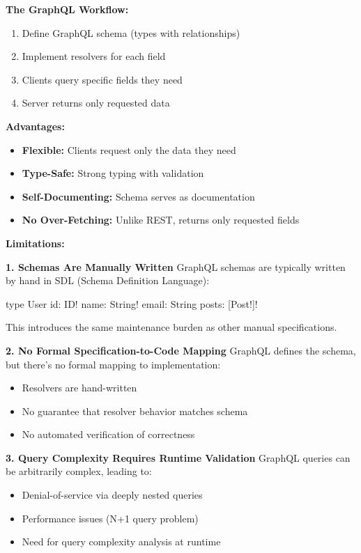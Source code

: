 \textbf{The GraphQL Workflow:}
\begin{enumerate}
    \item Define GraphQL schema (types with relationships)
    \item Implement resolvers for each field
    \item Clients query specific fields they need
    \item Server returns only requested data
\end{enumerate}

\textbf{Advantages:}
\begin{itemize}
    \item \textbf{Flexible:} Clients request only the data they need
    \item \textbf{Type-Safe:} Strong typing with validation
    \item \textbf{Self-Documenting:} Schema serves as documentation
    \item \textbf{No Over-Fetching:} Unlike REST, returns only requested fields
\end{itemize}

\textbf{Limitations:}

\textbf{1. Schemas Are Manually Written}
GraphQL schemas are typically written by hand in SDL (Schema Definition Language):
\begin{graphql}
type User {
  id: ID!
  name: String!
  email: String
  posts: [Post!]!
}
\end{graphql}

This introduces the same maintenance burden as other manual specifications.

\textbf{2. No Formal Specification-to-Code Mapping}
GraphQL defines the schema, but there's no formal mapping to implementation:
\begin{itemize}
    \item Resolvers are hand-written
    \item No guarantee that resolver behavior matches schema
    \item No automated verification of correctness
\end{itemize}

\textbf{3. Query Complexity Requires Runtime Validation}
GraphQL queries can be arbitrarily complex, leading to:
\begin{itemize}
    \item Denial-of-service via deeply nested queries
    \item Performance issues (N+1 query problem)
    \item Need for query complexity analysis at runtime
\end{itemize}

